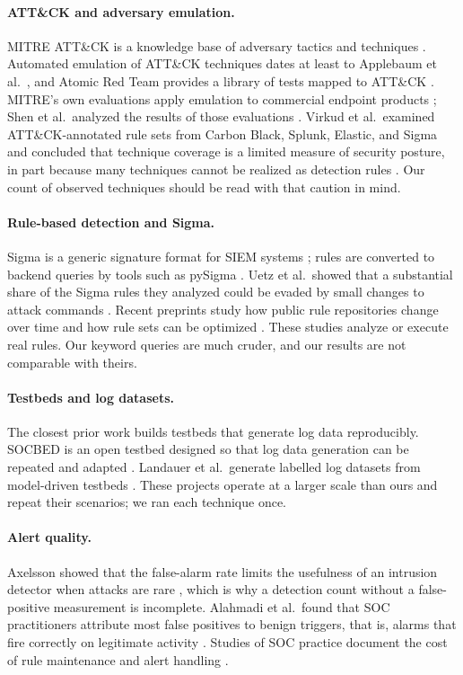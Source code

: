 \documentclass[11pt,a4paper]{article}
\begin{document}
\paragraph{ATT\&CK and adversary emulation.}
MITRE ATT\&CK is a knowledge base of adversary tactics and techniques
\cite{attack-design}. Automated emulation of ATT\&CK techniques dates at least
to Applebaum et al.\ \cite{applebaum2016}, and Atomic Red Team provides a
library of tests mapped to ATT\&CK \cite{atomic}. MITRE's own evaluations apply
emulation to commercial endpoint products \cite{attack-evals}; Shen et al.\
analyzed the results of those evaluations \cite{shen2024}. Virkud et al.\
examined ATT\&CK-annotated rule sets from Carbon Black, Splunk, Elastic, and
Sigma and concluded that technique coverage is a limited measure of security
posture, in part because many techniques cannot be realized as detection rules
\cite{virkud2024}. Our count of observed techniques should be read with that
caution in mind.

\paragraph{Rule-based detection and Sigma.}
Sigma is a generic signature format for SIEM systems \cite{sigma-spec}; rules
are converted to backend queries by tools such as pySigma \cite{pysigma}. Uetz
et al.\ showed that a substantial share of the Sigma rules they analyzed could
be evaded by small changes to attack commands \cite{uetz2024}. Recent preprints
study how public rule repositories change over time \cite{long2026} and how
rule sets can be optimized \cite{shukla2025}. These studies analyze or execute
real rules. Our keyword queries are much cruder, and our results are not
comparable with theirs.

\paragraph{Testbeds and log datasets.}
The closest prior work builds testbeds that generate log data reproducibly.
SOCBED is an open testbed designed so that log data generation can be repeated
and adapted \cite{uetz2021}. Landauer et al.\ generate labelled log datasets
from model-driven testbeds \cite{landauer2021,landauer2022}. These projects
operate at a larger scale than ours and repeat their scenarios; we ran each
technique once.

\paragraph{Alert quality.}
Axelsson showed that the false-alarm rate limits the usefulness of an
intrusion detector when attacks are rare \cite{axelsson2000}, which is why a
detection count without a false-positive measurement is incomplete. Alahmadi et
al.\ found that SOC practitioners attribute most false positives to benign
triggers, that is, alarms that fire correctly on legitimate activity
\cite{alahmadi2022}. Studies of SOC practice document the cost of rule
maintenance and alert handling \cite{vermeer2022,vermeer2023,kokulu2019}.
\end{document}

